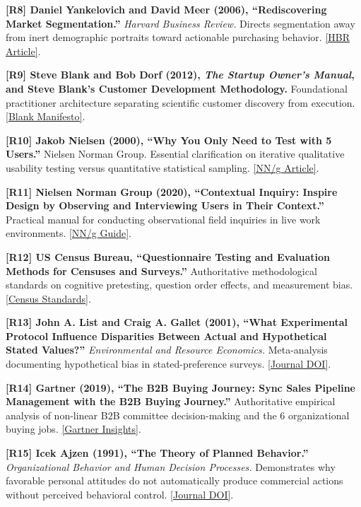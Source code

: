 \noindent\textbf{[R8] Daniel Yankelovich and David Meer (2006), ``Rediscovering Market Segmentation.''} \textit{Harvard Business Review.} Directs segmentation away from inert demographic portraits toward actionable purchasing behavior. \href{https://hbr.org/2006/02/rediscovering-market-segmentation}{[HBR Article]}.

\noindent\textbf{[R9] Steve Blank and Bob Dorf (2012), \textit{The Startup Owner's Manual}, and Steve Blank's Customer Development Methodology.} Foundational practitioner architecture separating scientific customer discovery from execution. \href{https://steveblank.com/2009/09/17/the-path-of-warriors-and-winners/}{[Blank Manifesto]}.

\noindent\textbf{[R10] Jakob Nielsen (2000), ``Why You Only Need to Test with 5 Users.''} Nielsen Norman Group. Essential clarification on iterative qualitative usability testing versus quantitative statistical sampling. \href{https://www.nngroup.com/articles/why-you-only-need-to-test-with-5-users/}{[NN/g Article]}.

\noindent\textbf{[R11] Nielsen Norman Group (2020), ``Contextual Inquiry: Inspire Design by Observing and Interviewing Users in Their Context.''} Practical manual for conducting observational field inquiries in live work environments. \href{https://www.nngroup.com/articles/contextual-inquiry/}{[NN/g Guide]}.

\noindent\textbf{[R12] US Census Bureau, ``Questionnaire Testing and Evaluation Methods for Censuses and Surveys.''} Authoritative methodological standards on cognitive pretesting, question order effects, and measurement bias. \href{https://www.census.gov/about/policies/quality/standards/appendixa2.html}{[Census Standards]}.

\noindent\textbf{[R13] John A. List and Craig A. Gallet (2001), ``What Experimental Protocol Influence Disparities Between Actual and Hypothetical Stated Values?''} \textit{Environmental and Resource Economics.} Meta-analysis documenting hypothetical bias in stated-preference surveys. \href{https://doi.org/10.1023/A:1012791822804}{[Journal DOI]}.

\noindent\textbf{[R14] Gartner (2019), ``The B2B Buying Journey: Sync Sales Pipeline Management with the B2B Buying Journey.''} Authoritative empirical analysis of non-linear B2B committee decision-making and the 6 organizational buying jobs. \href{https://www.gartner.com/en/sales/insights/b2b-buying-journey}{[Gartner Insights]}.

\noindent\textbf{[R15] Icek Ajzen (1991), ``The Theory of Planned Behavior.''} \textit{Organizational Behavior and Human Decision Processes.} Demonstrates why favorable personal attitudes do not automatically produce commercial actions without perceived behavioral control. \href{https://doi.org/10.1016/0749-5978(91)90020-T}{[Journal DOI]}.

